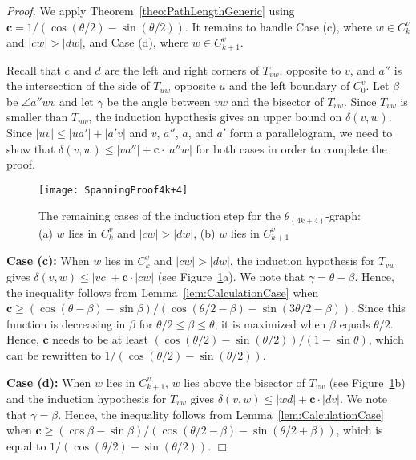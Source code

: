 \documentclass[12pt]{article}
\newenvironment{proof}{\emph{Proof.}}{\hfill $\Box$\\}
\newcommand{\graph}[1]{\ensuremath{\theta_{(4 k + #1)}}-graph\xspace}
\newcommand{\canon}[2]{\ensuremath{T_{#1 #2}}}
\newcommand{\const}{\ensuremath{\boldsymbol{c}}\xspace}
\begin{document}
\begin{proof}
  We apply Theorem~\ref{theo:PathLengthGeneric} using $\const = 1 / (\cos (\theta/2) - \sin (\theta/2))$. It remains to handle Case (c), where $w \in C_k^v$ and $|c w| > |d w|$, and Case (d), where $w \in C_{k+1}^v$. 

  Recall that $c$ and $d$ are the left and right corners of \canon{v}{w}, opposite to $v$, and $a''$ is the intersection of the side of $\canon{u}{w}$ opposite $u$ and the left boundary of $C_0^v$. Let $\beta$ be $\angle a'' w v$ and let $\gamma$ be the angle between $v w$ and the bisector of \canon{v}{w}. Since \canon{v}{w} is smaller than \canon{u}{w}, the induction hypothesis gives an upper bound on $\delta(v, w)$. Since $|u v| \leq |u a'| + |a' v|$ and $v$, $a''$, $a$, and $a'$ form a parallelogram, we need to show that $\delta(v, w) \leq |v a''| + \const \cdot |a'' w|$ for both cases in order to complete the proof. 

  \begin{figure}[ht]
    \begin{center}
      \texttt{[image: SpanningProof4k+4]}
    \end{center}
    \caption{The remaining cases of the induction step for the \graph{4}: (a) $w$ lies in $C_k^v$ and $|c w| > |d w|$, (b) $w$ lies in $C_{k+1}^v$}
    \label{fig:SpanningProof4k+4}
  \end{figure}

  \textbf{Case (c):} When $w$ lies in $C_k^v$ and $|c w| > |d w|$, the induction hypothesis for \canon{v}{w} gives $\delta(v, w) \leq |v c| + \const \cdot |c w|$ (see Figure~\ref{fig:SpanningProof4k+4}a). We note that $\gamma = \theta - \beta$. Hence, the inequality follows from Lemma~\ref{lem:CalculationCase} when $\const \geq (\cos (\theta - \beta) - \sin \beta) / (\cos (\theta/2 - \beta) - \sin (3\theta/2 - \beta))$. Since this function is decreasing in $\beta$ for $\theta/2 \leq \beta \leq \theta$, it is maximized when $\beta$ equals $\theta/2$. Hence, $\const$ needs to be at least $(\cos (\theta/2) - \sin (\theta/2)) / (1 - \sin \theta)$, which can be rewritten to $1 / (\cos (\theta/2) - \sin (\theta/2))$. 

  \textbf{Case (d):} When $w$ lies in $C_{k+1}^v$, $w$ lies above the bisector of \canon{v}{w} (see Figure~\ref{fig:SpanningProof4k+4}b) and the induction hypothesis for \canon{v}{w} gives $\delta(v, w) \leq |w d| + \const \cdot |d v|$. We note that $\gamma = \beta$. Hence, the inequality follows from Lemma~\ref{lem:CalculationCase} when $\const \geq (\cos \beta - \sin \beta) / (\cos (\theta/2 - \beta) - \sin (\theta/2 + \beta))$, which is equal to $1 / (\cos (\theta/2) - \sin (\theta/2))$. 
\end{proof}
\end{document}

